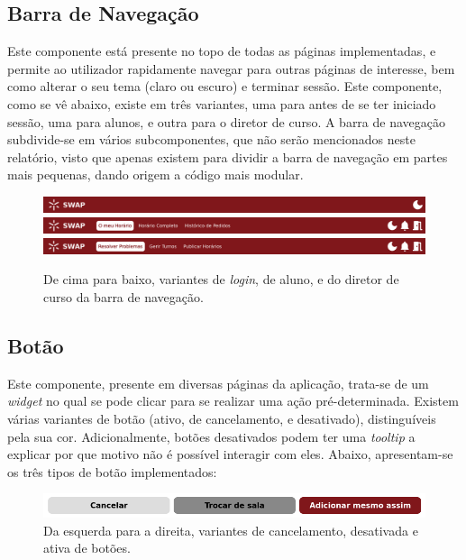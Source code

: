 \documentclass[12pt, a4paper]{article}
\begin{document}
\subsection{Barra de Navegação}

Este componente está presente no topo de todas as páginas implementadas, e permite ao utilizador
rapidamente navegar para outras páginas de interesse, bem como alterar o seu tema (claro ou escuro)
e terminar sessão. Este componente, como se vê abaixo, existe em três variantes, uma para antes de
se ter iniciado sessão, uma para alunos, e outra para o diretor de curso. A barra de navegação
subdivide-se em vários subcomponentes, que não serão mencionados neste relatório, visto que apenas
existem para dividir a barra de navegação em partes mais pequenas, dando origem a código mais
modular.

\begin{figure}[H]
    \centering
    \includegraphics[width=\textwidth]{res/components/navbar-login.png}
    \includegraphics[width=\textwidth]{res/components/navbar-student.png}
    \includegraphics[width=\textwidth]{res/components/navbar-director.png}
    \caption{
        \onehalfspacing
        De cima para baixo, variantes de \emph{login}, de aluno, e do diretor de curso da barra de
        navegação.
    }
    \label{navbar}
\end{figure}

\subsection{Botão}

Este componente, presente em diversas páginas da aplicação, trata-se de um \emph{widget} no qual se
pode clicar para se realizar uma ação pré-determinada. Existem várias variantes de botão (ativo, de
cancelamento, e desativado), distinguíveis pela sua cor. Adicionalmente, botões desativados podem
ter uma \emph{tooltip} a explicar por que motivo não é possível interagir com eles. Abaixo,
apresentam-se os três tipos de botão implementados:

\begin{figure}[H]
    \centering
    \includegraphics[width=\textwidth]{res/components/button.png}
    \caption{Da esquerda para a direita, variantes de cancelamento, desativada e ativa de botões.}
    \label{button}
\end{figure}
\end{document}
